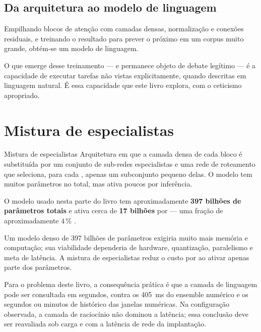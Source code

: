 \subsection{Da arquitetura ao modelo de linguagem}

Empilhando blocos de atenção com camadas densas, normalização e conexões residuais, e
treinando o resultado para prever o próximo  em um corpus muito
grande, obtém-se um modelo de linguagem.

O que emerge desse treinamento --- e permanece objeto de debate legítimo --- é a
capacidade de executar tarefas não vistas explicitamente, quando descritas em linguagem
natural. É essa capacidade que este livro explora, com o ceticismo apropriado.

\section{Mistura de especialistas}

\begin{definicao}{Mistura de especialistas}
Arquitetura em que a camada densa de cada bloco é substituída por um conjunto de
sub-redes especialistas e uma rede de roteamento que seleciona, para cada
, apenas um subconjunto pequeno delas. O modelo tem muitos parâmetros no
total, mas ativa poucos por inferência.
\end{definicao}

O modelo usado nesta parte do livro tem aproximadamente \textbf{397 bilhões de parâmetros
totais} e ativa cerca de \textbf{17 bilhões} por  --- uma fração de
aproximadamente $4\,\%$ \citep{Qwen35_2026}.

\begin{destaque}
Um modelo denso de 397 bilhões de parâmetros exigiria muito mais memória e computação;
sua viabilidade dependeria de hardware, quantização, paralelismo e meta de latência. A
mistura de especialistas reduz o custo por  ao ativar apenas parte dos
parâmetros.

Para o problema deste livro, a consequência prática é que a camada de linguagem pode ser
consultada em segundos, contra os \SI{405}{\milli\second} do ensemble numérico e os
segundos ou minutos de histórico das janelas numéricas. Na configuração observada, a
camada de raciocínio não dominou a latência; essa conclusão deve ser reavaliada sob carga
e com a latência de rede da implantação.
\end{destaque}

